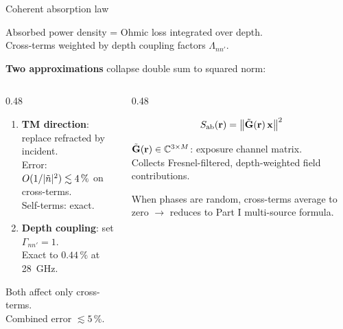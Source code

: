 \begin{frame}{Coherent absorption law}
\hypertarget{sum-p3-coherent-law}{}

  Absorbed power density = Ohmic loss integrated over depth.\\
  Cross-terms weighted by depth coupling factors $\Lambda_{nn'}$.

  \vspace{6pt}
  \textbf{Two approximations} collapse double sum to squared norm:

  \begin{columns}[T]
    \begin{column}{0.48\textwidth}
      \begin{enumerate}
        \item \textbf{TM direction}: replace refracted by incident.\\
              Error: $O(1/|\tilde{n}|^2) \lesssim 4\,\%$ on cross-terms.\\
              Self-terms: exact.
        \item \textbf{Depth coupling}: set $\Gamma_{nn'} = 1$.\\
              Exact to $0.44\,\%$ at \SI{28}{\giga\hertz}.
      \end{enumerate}

      \vspace{4pt}
      {\footnotesize Both affect only cross-terms.\\Combined error $\lesssim 5\,\%$.\\
       \;
       }
    \end{column}

    \begin{column}{0.48\textwidth}
      \begin{resultbox}
        \vspace{-6pt}
        \[
          S_{\mathrm{ab}}(\mathbf{r}) = \bigl\|\tilde{\mathbf{G}}(\mathbf{r})\,\mathbf{x}\bigr\|^2
        \]
      \end{resultbox}

      \vspace{4pt}
      $\tilde{\mathbf{G}}(\mathbf{r}) \in \mathbb{C}^{3 \times M}$: exposure channel matrix.\\[2pt]
      Collects Fresnel-filtered, depth-weighted field contributions.

      \vspace{6pt}
      {\footnotesize When phases are random, cross-terms average to zero
       $\rightarrow$ reduces to Part I multi-source formula.}
    \end{column}
  \end{columns}
\end{frame}

